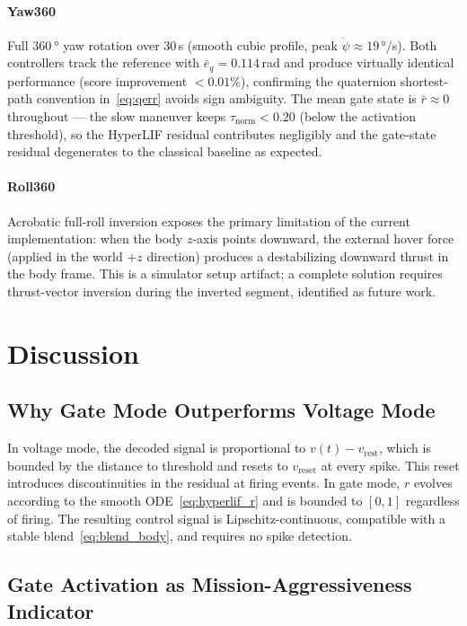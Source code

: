 \documentclass[conference]{IEEEtran}
\begin{document}
\paragraph{Yaw360} Full $\SI{360}{\degree}$ yaw rotation over 30\,s
(smooth cubic profile, peak $\dot{\psi}{\approx}19$\,°/s).
Both controllers track the reference with $\bar{e}_q{=}0.114$\,rad and
produce virtually identical performance (score improvement
$<0.01\%$), confirming the quaternion shortest-path convention
in~\eqref{eq:qerr} avoids sign ambiguity.
The mean gate state is $\bar{r}{\approx}0$ throughout — the slow
maneuver keeps $\tau_\mathrm{norm}{<}0.20$ (below the activation
threshold), so the HyperLIF residual contributes negligibly and the
gate-state residual degenerates to the classical baseline as expected.

\paragraph{Roll360} Acrobatic full-roll inversion exposes the primary
limitation of the current implementation: when the body $z$-axis points
downward, the external hover force (applied in the world $+z$ direction)
produces a destabilizing downward thrust in the body frame.
This is a simulator setup artifact; a complete solution requires thrust-vector
inversion during the inverted segment, identified as future work.

\section{Discussion}
\label{sec:discussion}

\subsection{Why Gate Mode Outperforms Voltage Mode}

In voltage mode, the decoded signal is proportional to $v(t) - v_{\mathrm{rest}}$,
which is bounded by the distance to threshold and resets to $v_{\mathrm{reset}}$
at every spike.
This reset introduces discontinuities in the residual at firing events.
In gate mode, $r$ evolves according to the smooth ODE~\eqref{eq:hyperlif_r}
and is bounded to $[0,1]$ regardless of firing.
The resulting control signal is Lipschitz-continuous, compatible
with a stable blend~\eqref{eq:blend_body}, and requires no spike detection.

\subsection{Gate Activation as Mission-Aggressiveness Indicator}
\end{document}
